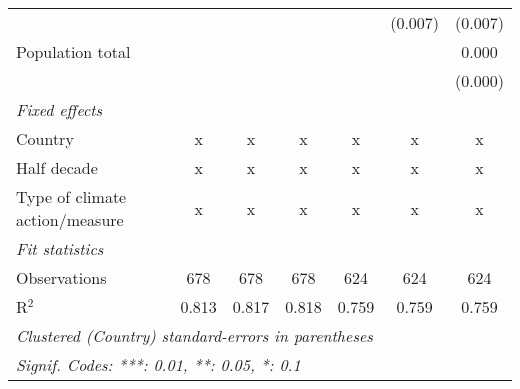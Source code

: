 \begin{tabular}{lcccccc}
                                                        &              &               &               &               & (0.007)       & (0.007)\\   
   Population total                                     &              &               &               &               &               & 0.000\\   
                                                        &              &               &               &               &               & (0.000)\\   
   \emph{Fixed effects}\\
   Country                                              & x            & x             & x             & x             & x             & x\\  
   Half decade                                          & x            & x             & x             & x             & x             & x\\  
   Type of climate action/measure                       & x            & x             & x             & x             & x             & x\\  
   \midrule \emph{Fit statistics}\\
   Observations                                         & 678          & 678           & 678           & 624           & 624           & 624\\  
   R$^2$                                                & 0.813        & 0.817         & 0.818         & 0.759         & 0.759         & 0.759\\  
   \midrule
   \multicolumn{7}{l}{\emph{Clustered (Country) standard-errors in parentheses}}\\
   \multicolumn{7}{l}{\emph{Signif. Codes: ***: 0.01, **: 0.05, *: 0.1}}\\
\end{tabular}
\par\endgroup


